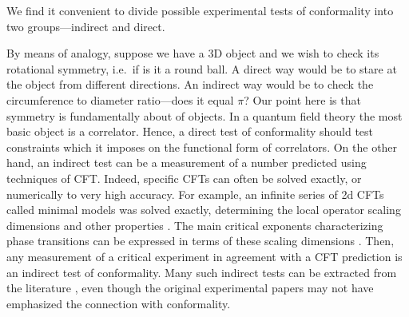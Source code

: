 \documentclass[a4paper,11pt]{article}
\theoremstyle{remark}
\theoremstyle{theorem}
\begin{document}
We find it convenient to divide possible experimental tests of conformality
into two groups---indirect and direct.

By means of analogy, suppose we have a 3D object and we wish to check its
rotational symmetry, i.e.~if is it a round ball. A direct way would be to
stare at the object from different directions. An indirect way would be to
check the circumference to diameter ratio---does it equal $\pi$? Our point here is
that symmetry is fundamentally about  of objects. In
a quantum field theory the most basic object is a correlator. Hence, a direct
test of conformality should test constraints which it imposes on the
functional form of correlators. On the other hand, an indirect test can be a
measurement of a number predicted using techniques of CFT. Indeed, specific CFTs can
often be solved exactly, or numerically to very high accuracy. For example, an
infinite series of 2d CFTs called minimal models was solved exactly,
determining the local operator scaling dimensions and other properties
{\cite{Belavin:1984vu,DiFrancesco:1997nk}}. The main critical exponents
characterizing phase transitions can be expressed in terms of these scaling
dimensions {\cite{cardy1996scaling}}. Then, any measurement of a critical experiment
in agreement with a CFT prediction is an indirect test of conformality. Many
such indirect tests can be extracted from the literature
{\cite{Henkel1999,Rychkov:2025zks}}, even though the original experimental
papers may not have emphasized the connection with conformality.
\end{document}

